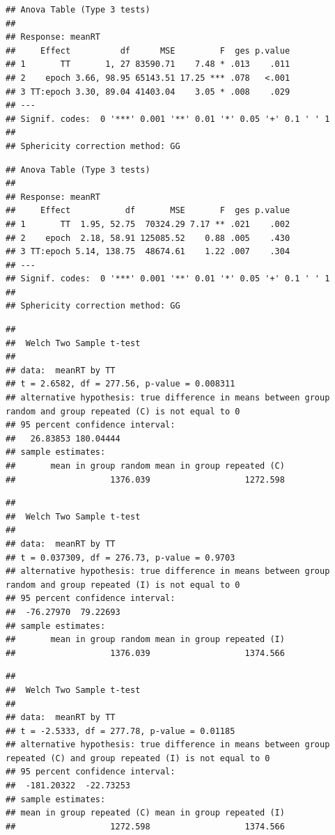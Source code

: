 \documentclass[
  man]{apa6}
\begin{document}
\begin{verbatim}
## Anova Table (Type 3 tests)
## 
## Response: meanRT
##     Effect          df      MSE         F  ges p.value
## 1       TT       1, 27 83590.71    7.48 * .013    .011
## 2    epoch 3.66, 98.95 65143.51 17.25 *** .078   <.001
## 3 TT:epoch 3.30, 89.04 41403.04    3.05 * .008    .029
## ---
## Signif. codes:  0 '***' 0.001 '**' 0.01 '*' 0.05 '+' 0.1 ' ' 1
## 
## Sphericity correction method: GG
\end{verbatim}

\begin{verbatim}
## Anova Table (Type 3 tests)
## 
## Response: meanRT
##     Effect           df       MSE       F  ges p.value
## 1       TT  1.95, 52.75  70324.29 7.17 ** .021    .002
## 2    epoch  2.18, 58.91 125085.52    0.88 .005    .430
## 3 TT:epoch 5.14, 138.75  48674.61    1.22 .007    .304
## ---
## Signif. codes:  0 '***' 0.001 '**' 0.01 '*' 0.05 '+' 0.1 ' ' 1
## 
## Sphericity correction method: GG
\end{verbatim}

\begin{verbatim}
## 
##  Welch Two Sample t-test
## 
## data:  meanRT by TT
## t = 2.6582, df = 277.56, p-value = 0.008311
## alternative hypothesis: true difference in means between group random and group repeated (C) is not equal to 0
## 95 percent confidence interval:
##   26.83853 180.04444
## sample estimates:
##       mean in group random mean in group repeated (C) 
##                   1376.039                   1272.598
\end{verbatim}

\begin{verbatim}
## 
##  Welch Two Sample t-test
## 
## data:  meanRT by TT
## t = 0.037309, df = 276.73, p-value = 0.9703
## alternative hypothesis: true difference in means between group random and group repeated (I) is not equal to 0
## 95 percent confidence interval:
##  -76.27970  79.22693
## sample estimates:
##       mean in group random mean in group repeated (I) 
##                   1376.039                   1374.566
\end{verbatim}

\begin{verbatim}
## 
##  Welch Two Sample t-test
## 
## data:  meanRT by TT
## t = -2.5333, df = 277.78, p-value = 0.01185
## alternative hypothesis: true difference in means between group repeated (C) and group repeated (I) is not equal to 0
## 95 percent confidence interval:
##  -181.20322  -22.73253
## sample estimates:
## mean in group repeated (C) mean in group repeated (I) 
##                   1272.598                   1374.566
\end{verbatim}
\end{document}
